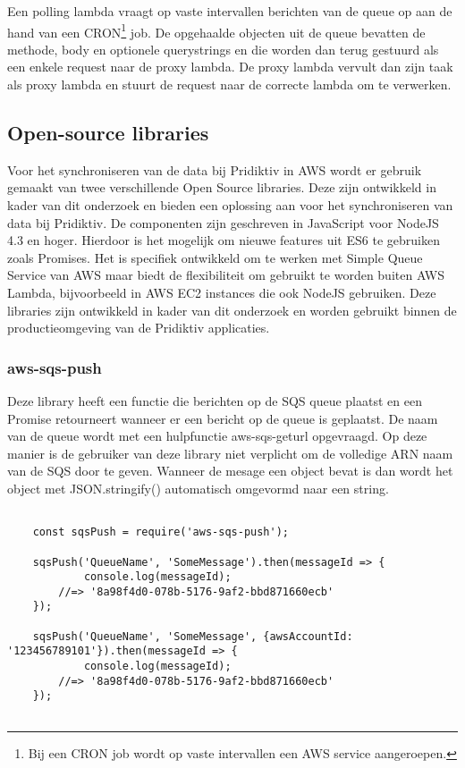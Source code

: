 Een polling lambda vraagt op vaste intervallen berichten van de queue op aan de hand van een CRON\footnote{Bij een CRON job wordt op vaste intervallen een AWS service aangeroepen.} job. De opgehaalde objecten uit de queue bevatten de methode, body en optionele querystrings en die worden dan terug gestuurd als een enkele request naar de proxy lambda. De proxy lambda vervult dan zijn taak als proxy lambda en stuurt de request naar de correcte lambda om te verwerken.
\subsection{Open-source libraries}
Voor het synchroniseren van de data bij Pridiktiv in AWS wordt er gebruik gemaakt van twee verschillende Open Source libraries. Deze zijn ontwikkeld in kader van dit onderzoek en bieden een oplossing aan voor het synchroniseren van data bij Pridiktiv. De componenten zijn geschreven in JavaScript voor NodeJS 4.3 en hoger. Hierdoor is het mogelijk om nieuwe features uit ES6 te gebruiken zoals Promises. Het is specifiek ontwikkeld om te werken met Simple Queue Service van AWS maar biedt de flexibiliteit om gebruikt te worden buiten AWS Lambda, bijvoorbeeld in AWS EC2 instances die ook NodeJS gebruiken. Deze libraries zijn ontwikkeld in kader van dit onderzoek en worden gebruikt binnen de productieomgeving van de Pridiktiv applicaties.
\subsubsection{aws-sqs-push}
Deze library heeft een functie die berichten op de SQS queue plaatst en een Promise retourneert wanneer er een bericht op de queue is geplaatst. De naam van de queue wordt met een hulpfunctie aws-sqs-geturl opgevraagd. Op deze manier is de gebruiker van deze library niet verplicht om de volledige ARN naam van de SQS door te geven. Wanneer de mesage een object bevat is dan wordt het object met JSON.stringify() automatisch omgevormd naar een string.

\begin{lstlisting}[caption=Voorbeeld dat data plaatst op een SQS queue met behulp van de aws-sqs-push library]

	const sqsPush = require('aws-sqs-push');

	sqsPush('QueueName', 'SomeMessage').then(messageId => {
    		console.log(messageId);
    	//=> '8a98f4d0-078b-5176-9af2-bbd871660ecb'
	});

	sqsPush('QueueName', 'SomeMessage', {awsAccountId: '123456789101'}).then(messageId => {
    		console.log(messageId);
    	//=> '8a98f4d0-078b-5176-9af2-bbd871660ecb'
	});
	
\end{lstlisting}
\clearpage
